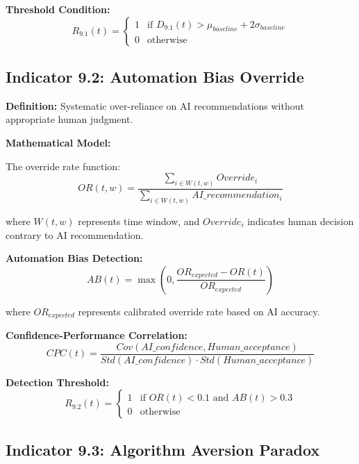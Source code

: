 \documentclass[11pt,a4paper]{article}
\begin{document}
\textbf{Threshold Condition:}
\begin{equation}
R_{9.1}(t) = \begin{cases}
1 & \text{if } D_{9.1}(t) > \mu_{baseline} + 2\sigma_{baseline} \\
0 & \text{otherwise}
\end{cases}
\end{equation}

\subsection{Indicator 9.2: Automation Bias Override}

\textbf{Definition:} Systematic over-reliance on AI recommendations without appropriate human judgment.

\textbf{Mathematical Model:}

The override rate function:
\begin{equation}
OR(t,w) = \frac{\sum_{i \in W(t,w)} Override_i}{\sum_{i \in W(t,w)} AI\_recommendation_i}
\end{equation}

where $W(t,w)$ represents time window, and $Override_i$ indicates human decision contrary to AI recommendation.

\textbf{Automation Bias Detection:}
\begin{equation}
AB(t) = \max(0, \frac{OR_{expected} - OR(t)}{OR_{expected}})
\end{equation}

where $OR_{expected}$ represents calibrated override rate based on AI accuracy.

\textbf{Confidence-Performance Correlation:}
\begin{equation}
CPC(t) = \frac{Cov(AI\_confidence, Human\_acceptance)}{Std(AI\_confidence) \cdot Std(Human\_acceptance)}
\end{equation}

\textbf{Detection Threshold:}
\begin{equation}
R_{9.2}(t) = \begin{cases}
1 & \text{if } OR(t) < 0.1 \text{ and } AB(t) > 0.3 \\
0 & \text{otherwise}
\end{cases}
\end{equation}

\subsection{Indicator 9.3: Algorithm Aversion Paradox}
\end{document}
